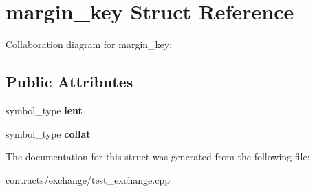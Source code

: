 \hypertarget{structmargin__key}{}\section{margin\+\_\+key Struct Reference}
\label{structmargin__key}


Collaboration diagram for margin\+\_\+key\+:
\subsection*{Public Attributes}
\begin{DoxyCompactItemize}
\item 
\mbox{\label{structmargin__key_a4ee630e5a8b6e5e8516a030c34c1712d}} 
symbol\+\_\+type {\bfseries lent}
\item 
\mbox{\label{structmargin__key_a384d61a142158ec943d957b9ea2e0a64}} 
symbol\+\_\+type {\bfseries collat}
\end{DoxyCompactItemize}


The documentation for this struct was generated from the following file\+:\begin{DoxyCompactItemize}
\item 
contracts/exchange/test\+\_\+exchange.\+cpp\end{DoxyCompactItemize}
